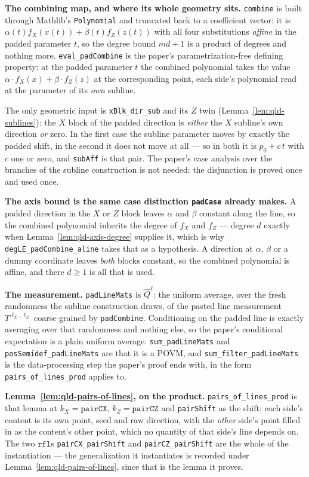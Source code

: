 \textbf{The combining map, and where its whole geometry sits.} \texttt{combine} is built through
Mathlib's \texttt{Polynomial} and truncated back to a coefficient vector: it is
$\alpha(t) f_X(x(t)) + \beta(t) f_Z(z(t))$ with all four substitutions \emph{affine} in the padded
parameter $t$, so the degree bound $md+1$ is a product of degrees and nothing more.
\texttt{eval\_padCombine} is the paper's parametrization-free defining property: at the padded
parameter $t$ the combined polynomial takes the value $\alpha \cdot f_X(x) + \beta \cdot f_Z(z)$
at the corresponding point, each side's polynomial read at the parameter of its \emph{own} subline.

The only geometric input is \texttt{xBlk\_dir\_sub} and its $Z$ twin
(Lemma~\ref{lem:qld-sublines}): the $X$ block of the padded direction is \emph{either} the $X$
subline's own direction \emph{or} zero. In the first case the subline parameter moves by exactly the
padded shift, in the second it does not move at all --- so in both it is $p_0 + c\,t$ with $c$ one or
zero, and \texttt{subAff} is that pair. The paper's case analysis over the branches of the subline
construction is not needed: the disjunction is proved once and used once.

\textbf{The axis bound is the same case distinction \texttt{padCase} already makes.} A padded
direction in the $X$ or $Z$ block leaves $\alpha$ and $\beta$ constant along the line, so the
combined polynomial inherits the degree of $f_X$ and $f_Z$ --- degree $d$ exactly when
Lemma~\ref{lem:qld-axis-degree} supplies it, which is why
\texttt{degLE\_padCombine\_aline} takes that as a hypothesis. A direction at $\alpha$, $\beta$ or
a dummy coordinate leaves \emph{both} blocks constant, so the combined polynomial is affine, and
there $d \geq 1$ is all that is used.

\textbf{The measurement.} \texttt{padLineMats} is $\widehat Q^\ell$: the uniform average, over
the fresh randomness the subline construction draws, of the pasted line measurement
$T^{\ell_X,\ell_Z}$ coarse-grained by \texttt{padCombine}. Conditioning on the padded line is
exactly averaging over that randomness and nothing else, so the paper's conditional expectation is a
plain uniform average. \texttt{sum\_padLineMats} and \texttt{posSemidef\_padLineMats} are that it
is a POVM, and \texttt{sum\_filter\_padLineMats} is the data-processing step the paper's proof ends
with, in the form \texttt{pairs\_of\_lines\_prod} applies to.

\textbf{Lemma~\ref{lem:qld-pairs-of-lines}, on the product.}
\texttt{pairs\_of\_lines\_prod} is that lemma at $k_X = \mathtt{pairCX}$,
$k_Z = \mathtt{pairCZ}$ and \texttt{pairShift} as the shift: each side's content is its own point,
seed and raw direction, with the \emph{other} side's point filled in as the content's other point,
which no quantity of that side's line depends on. The two $\mathtt{rfl}$s
\texttt{pairCX\_pairShift} and \texttt{pairCZ\_pairShift} are the whole of the instantiation ---
the generalization it instantiates is recorded under
Lemma~\ref{lem:qld-pairs-of-lines}, since that is the lemma it proves.


